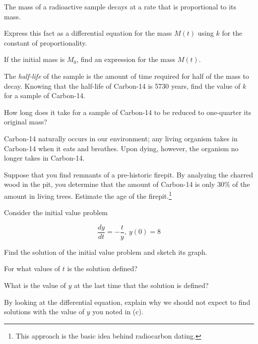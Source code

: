 \begin{exercises} 
  \item  The mass of a radioactive sample decays at a rate that is
    proportional to its mass. 
    \ba
  \item Express this fact as a differential equation for the mass
    $M(t)$ using $k$ for the constant of proportionality.
    \item If the initial mass is $M_0$, find an expression for the
      mass $M(t)$.
    \item The {\em half-life} of the sample is the amount of time
      required for half of the mass to decay.  Knowing that the
      half-life of Carbon-14 is 5730 years, find the value of $k$ for
      a sample of Carbon-14.
    \item How long does it take for a sample of Carbon-14 to be
      reduced to one-quarter its original mass?
    \item Carbon-14 naturally occurs in our environment; any
      living organism takes in Carbon-14 when it eats and breathes.  Upon
      dying, however, the organism no longer takes in Carbon-14. 
      
      Suppose that you find remnants of a pre-historic firepit.  By
      analyzing the charred wood in the pit, you determine that the
      amount of Carbon-14 is only 30\% of the amount in living trees.
      Estimate the age of the firepit.\footnote{This approach is the basic idea behind radiocarbon dating.}

      
    \ea

  \item Consider the initial value problem
    
    $$  \frac{dy}{dt} = -\frac ty, \ y(0) = 8$$
    

    \ba
    \item Find the solution of the initial value problem and sketch its
      graph.

    \item For what values of $t$ is the solution defined?  

    \item What is the value of $y$ at the last time that the
      solution is defined? 

    \item By looking at the differential equation, explain why we
      should not expect to find solutions with the value of $y$ you noted in (c).

      \ea


\end{exercises}
